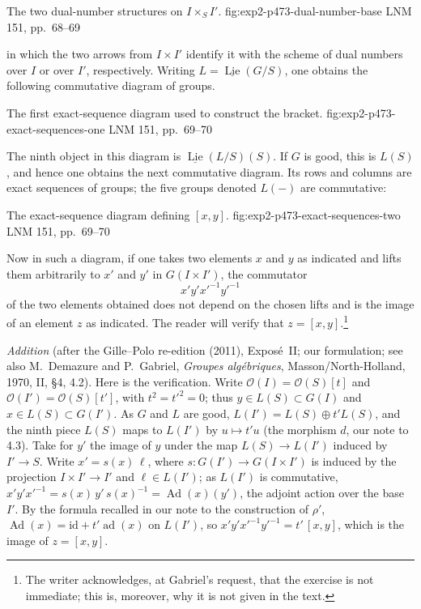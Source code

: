   {The two dual-number structures on \(I\times_S I'\).}
  {fig:exp2-p473-dual-number-base}
  {LNM 151, pp.~68--69}

in which the two arrows from \(I\times I'\) identify it with the
scheme of dual numbers over \(I\) or over \(I'\), respectively.
Writing \(L=\underline{\operatorname{Lie}}(G/S)\), one obtains the
following commutative diagram of groups.

  {The first exact-sequence diagram used to construct the bracket.}
  {fig:exp2-p473-exact-sequences-one}
  {LNM 151, pp.~69--70}

The ninth object in this diagram is
\(\underline{\operatorname{Lie}}(L/S)(S)\). If \(G\) is good, this
is \(L(S)\), and hence one obtains the next commutative diagram. Its
rows and columns are exact sequences of groups; the five groups
denoted \(L(-)\) are commutative:

  {The exact-sequence diagram defining \([x,y]\).}
  {fig:exp2-p473-exact-sequences-two}
  {LNM 151, pp.~69--70}

Now in such a diagram, if one takes two elements \(x\) and \(y\) as
indicated and lifts them arbitrarily to \(x'\) and \(y'\) in
\(G(I\times I')\), the commutator
\[
 x'y'x'^{-1}y'^{-1}
\]
of the two elements obtained does not depend on the chosen lifts and is
the image of an element \(z\) as indicated. The reader will verify that \(z=[x,y]\).\footnote{The writer
acknowledges, at Gabriel's request, that the exercise is not immediate;
this is, moreover, why it is not given in the text.}

\par\medskip\noindent
\emph{Addition} (after the Gille--Polo re-edition (2011), Expos\'e~II; our
formulation; see also M.~Demazure and P.~Gabriel, \emph{Groupes
alg\'ebriques}, Masson/North-Holland, 1970, II, \S4, 4.2). Here is the
verification. Write \(\mathcal O(I)=\mathcal O(S)[t]\) and
\(\mathcal O(I')=\mathcal O(S)[t']\), with \(t^2=t'^2=0\); thus
\(y\in L(S)\subset G(I)\) and \(x\in L(S)\subset G(I')\). As \(G\) and
\(L\) are good, \(L(I')=L(S)\oplus t'L(S)\), and the ninth piece
\(L(S)\) maps to \(L(I')\) by \(u\mapsto t'u\) (the morphism \(d\), our note
to 4.3). Take for \(y'\) the image of \(y\) under the map
\(L(S)\to L(I')\) induced by \(I'\to S\). Write \(x'=s(x)\,\ell\), where
\(s\colon G(I')\to G(I\times I')\) is induced by the projection
\(I\times I'\to I'\) and \(\ell\in L(I')\); as \(L(I')\) is commutative,
\(x'y'x'^{-1}=s(x)\,y'\,s(x)^{-1}=\operatorname{Ad}(x)(y')\), the adjoint
action over the base \(I'\). By the formula recalled in our note to the
construction of \(\rho'\), \(\operatorname{Ad}(x)=\mathrm{id}+t'\operatorname{ad}(x)\)
on \(L(I')\), so \(x'y'x'^{-1}y'^{-1}=t'\,[x,y]\), which is the image of
\(z=[x,y]\).
\par\medskip

